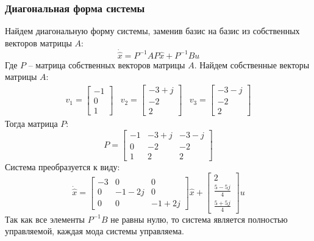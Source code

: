 \subsubsection{Диагональная форма системы}
Найдем диагональную форму системы, заменив базис на базис из собственных векторов матрицы $A$:
\begin{equation}
    \dot{\hat{x}} = P^{-1}AP\hat{x} + P^{-1}Bu
\end{equation}
Где $P$ -- матрица собственных векторов матрицы $A$. 
Найдем собственные векторы матрицы $A$:
\begin{equation}
    \begin{array}{ccc}
        v_1 = \begin{bmatrix} -1 \\ 0 \\ 1 \end{bmatrix} &
        v_2 = \begin{bmatrix} -3+j \\ -2 \\ 2 \end{bmatrix} &
        v_3 = \begin{bmatrix} -3-j \\ -2 \\ 2 \end{bmatrix} 
    \end{array}
\end{equation}
Тогда матрица $P$:
\begin{equation}
    P = \begin{bmatrix}
        -1 & -3+j & -3-j \\
        0 & -2 & -2 \\
        1 & 2 & 2
    \end{bmatrix}
\end{equation}
Система преобразуется к виду:
\begin{equation}
    \dot{\hat{x}} = \begin{bmatrix}
        -3 & 0 & 0 \\
        0 & -1-2j & 0 \\
        0 & 0 & -1+2j
    \end{bmatrix} \hat{x} + 
    \begin{bmatrix}
        2 \\
        \frac{5 - 5j}{4} \\ 
        \frac{5 + 5j}{4}
    \end{bmatrix} u
\end{equation}
Так как все элементы $P^{-1}B$ не равны нулю, то система является полностью управляемой, каждая мода системы управляема.

